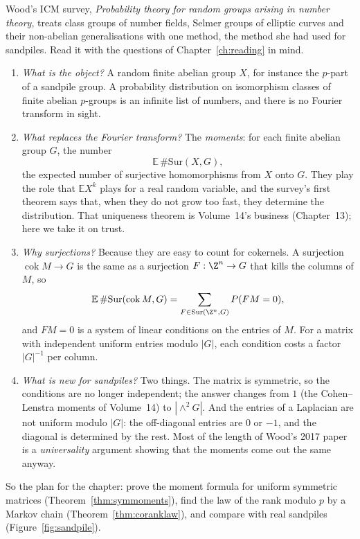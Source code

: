 Wood's ICM survey, \emph{Probability theory for random groups arising in number theory}, treats class groups of number fields, Selmer groups of elliptic curves and their non-abelian generalisations with one method, the method she had used for sandpiles. Read it with the questions of Chapter~\ref{ch:reading} in mind.
\begin{enumerate}
\item \emph{What is the object?} A random finite abelian group $X$, for instance the $p$-part of a sandpile group. A probability distribution on isomorphism classes of finite abelian $p$-groups is an infinite list of numbers, and there is no Fourier transform in sight.
\item \emph{What replaces the Fourier transform?} The \emph{moments}: for each finite abelian group $G$, the number
\[
\mathbb E\,\#\mathrm{Sur}(X,G),
\]
the expected number of surjective homomorphisms from $X$ onto $G$. They play the role that $\mathbb EX^k$ plays for a real random variable, and the survey's first theorem says that, when they do not grow too fast, they determine the distribution. That uniqueness theorem is Volume~14's business (Chapter~13); here we take it on trust.
\item \emph{Why surjections?} Because they are easy to count for cokernels. A surjection $\operatorname{cok}M\to G$ is the same as a surjection $F:\Z^n\to G$ that kills the columns of $M$, so
\[
\mathbb E\,\#\mathrm{Sur}(\operatorname{cok}M,G)=\sum_{F\in\mathrm{Sur}(\Z^n,G)}P(FM=0),
\]
and $FM=0$ is a system of linear conditions on the entries of $M$. For a matrix with independent uniform entries modulo $|G|$, each condition costs a factor $|G|^{-1}$ per column.
\item \emph{What is new for sandpiles?} Two things. The matrix is symmetric, so the conditions are no longer independent; the answer changes from $1$ (the Cohen--Lenstra moments of Volume~14) to $|\wedge^2G|$. And the entries of a Laplacian are not uniform modulo $|G|$: the off-diagonal entries are $0$ or $-1$, and the diagonal is determined by the rest. Most of the length of Wood's 2017 paper is a \emph{universality} argument showing that the moments come out the same anyway.
\end{enumerate}

So the plan for the chapter: prove the moment formula for uniform symmetric matrices (Theorem~\ref{thm:symmoments}), find the law of the rank modulo $p$ by a Markov chain (Theorem~\ref{thm:coranklaw}), and compare with real sandpiles (Figure~\ref{fig:sandpile}).

